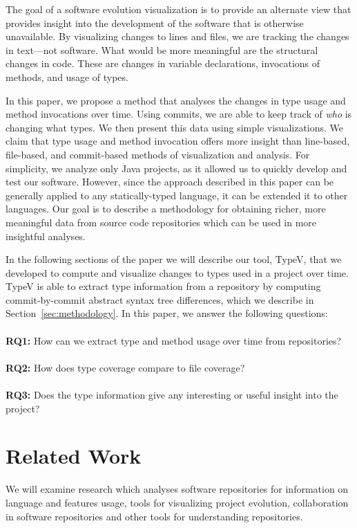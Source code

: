 The goal of a software evolution visualization is to provide an alternate view that provides insight into the development of the software that is otherwise unavailable. By visualizing changes to lines and files, we are tracking the changes in text---not software. What would be more meaningful are the structural changes in code. These are changes in variable declarations, invocations of methods, and usage of types.

In this paper, we propose a method that analyses the changes in type usage and method invocations over time. Using commits, we are able to keep track of \emph{who} is changing what types. We then present this data using simple visualizations. We claim that type usage and method invocation offers more insight than line-based, file-based, and commit-based methods of visualization and analysis. For simplicity, we analyze only Java projects, as it allowed us to quickly develop and test our software. However, since the approach described in this paper can be generally applied to any statically-typed language, it can be extended it to other languages. Our goal is to describe a methodology for obtaining richer, more meaningful data from source code repositories which can be used in more insightful analyses.

In the following sections of the paper we will describe our tool, TypeV, that we developed to compute and visualize changes to types used in a project over time. TypeV is able to extract type information from a repository by computing commit-by-commit abstract syntax tree differences, which we describe in Section~\ref{sec:methodology}. In this paper, we answer the following questions: \\ \\
\textbf{RQ1:} How can we extract type and method usage over time from repositories? \\ \\
\textbf{RQ2:} How does type coverage compare to file coverage?
\\ \\
\textbf{RQ3:} Does the type information give any interesting or useful insight into the project?

\section{Related Work}

We will examine research which analyses software repositories for information on language and features usage, tools for visualizing project evolution, collaboration in software repositories and other tools for understanding repositories.

